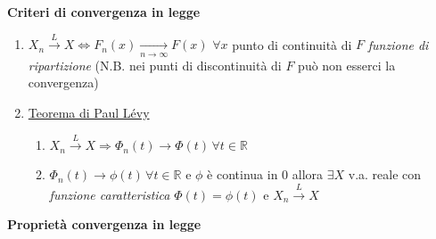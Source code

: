 \documentclass[openany]{book} %
\begin{document}
\textbf{Criteri di convergenza in legge}

\begin{enumerate}

	\item $X_n \overset{L}{\rightarrow}X \Leftrightarrow F_n(x)\underset{n \rightarrow\infty}{\rightarrow}F(x)$ $\forall x$ punto di continuità di $F$ \textit{funzione di ripartizione} (N.B. nei punti di discontinuità di $F$ può non esserci la convergenza)

	\item \underline{Teorema di Paul Lévy}

	      \begin{enumerate}

		      \item $X_n \overset{L}{\rightarrow}X \Rightarrow \Phi_n(t)\rightarrow\Phi(t)\,\forall t\in \mathbb{R}$

		      \item $\Phi_n(t)\rightarrow\phi(t)\,\forall t\in \mathbb{R}$ e $\phi$ è continua in 0 allora $\exists X$ v.a. reale con \textit{funzione caratteristica} $\Phi(t)=\phi(t)$ e $X_n \overset{L}{\rightarrow}X$

	      \end{enumerate}

\end{enumerate}

\textbf{Proprietà convergenza in legge}
\end{document}
